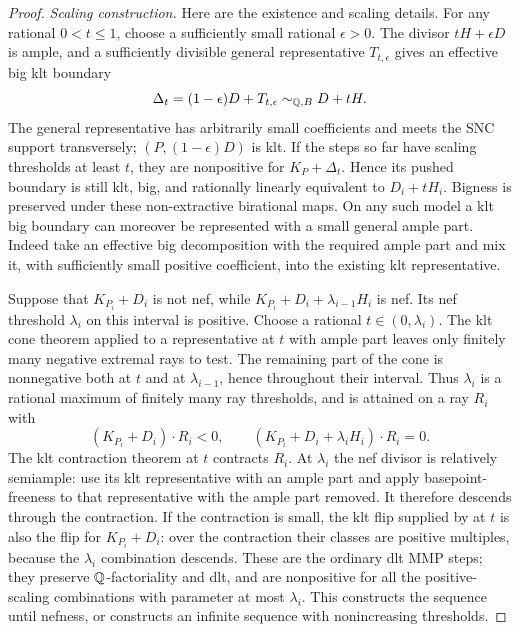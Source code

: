 \begin{proof}
\smallskip\noindent\emph{Scaling construction.}
Here are the existence and scaling details.  For any rational
$0<t\leq1$, choose a sufficiently small rational $\epsilon>0$.
The divisor $tH+\epsilon D$ is ample, and a sufficiently divisible
general representative $T_{t,\epsilon}$ gives an effective big klt
boundary
\begin{equation}\label{inc:klt-representative}
 \Delta_t=(1-\epsilon)D+T_{t,\epsilon}
 \sim_{\mathbb Q,B}D+tH.
\end{equation}
The general representative has arbitrarily small coefficients and
meets the SNC support transversely; $(P,(1-\epsilon)D)$ is klt.
If the steps so far have scaling thresholds at least $t$, they are
nonpositive for $K_P+\Delta_t$.  Hence its pushed boundary is still
klt, big, and rationally linearly equivalent to $D_i+tH_i$.
Bigness is preserved under these non-extractive birational maps.
On any such model a klt big boundary can moreover be represented
with a small general ample part.  Indeed take an effective big
decomposition with the required ample part and mix it, with sufficiently
small positive coefficient, into the existing klt representative.

Suppose that $K_{P_i}+D_i$ is not nef, while
$K_{P_i}+D_i+\lambda_{i-1}H_i$ is nef.  Its nef threshold
$\lambda_i$ on this interval is positive.  Choose a rational
$t\in(0,\lambda_i)$.  The klt cone theorem applied to a representative
at $t$ with ample part leaves only finitely many negative extremal rays
to test.  The remaining part of the cone is nonnegative both at $t$
and at $\lambda_{i-1}$, hence throughout their interval.  Thus
$\lambda_i$ is a rational maximum of finitely many ray thresholds,
and is attained on a ray $R_i$ with
\[
 (K_{P_i}+D_i)\cdot R_i<0,
 \qquad (K_{P_i}+D_i+\lambda_iH_i)\cdot R_i=0.
\]
The klt contraction theorem at $t$ contracts $R_i$.  At $\lambda_i$
the nef divisor is relatively semiample: use its klt representative
with an ample part and apply basepoint-freeness to that representative
with the ample part removed.  It therefore descends through the
contraction.  If the contraction is small, the klt flip supplied by
\cite{BCHM} at $t$ is also the flip for $K_{P_i}+D_i$: over the
contraction their classes are positive multiples, because the
$\lambda_i$ combination descends.  These are the ordinary dlt MMP
steps; they preserve $\mathbb Q$-factoriality and dlt, and are nonpositive
for all the positive-scaling combinations with parameter at most
$\lambda_i$.  This constructs the sequence until nefness, or constructs
an infinite sequence with nonincreasing thresholds.


\end{proof}
